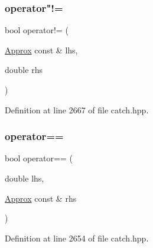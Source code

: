 \hypertarget{class_catch_1_1_detail_1_1_approx_a7497ef839f8026cc0edd6269a80f3e09}{}\label{class_catch_1_1_detail_1_1_approx_a7497ef839f8026cc0edd6269a80f3e09} 
\subsubsection{\texorpdfstring{operator"!=}{operator!=}\hspace{0.1cm}{\footnotesize\ttfamily [2/2]}}
{\footnotesize\ttfamily bool operator!= (\begin{DoxyParamCaption}\item[{\hyperlink{class_catch_1_1_detail_1_1_approx}{Approx} const \&}]{lhs,  }\item[{double}]{rhs }\end{DoxyParamCaption})\hspace{0.3cm}{\ttfamily [friend]}}



Definition at line 2667 of file catch.\+hpp.

\hypertarget{class_catch_1_1_detail_1_1_approx_ac766f044f1c63f0c5997982baefd9049}{}\label{class_catch_1_1_detail_1_1_approx_ac766f044f1c63f0c5997982baefd9049} 
\subsubsection{\texorpdfstring{operator==}{operator==}\hspace{0.1cm}{\footnotesize\ttfamily [1/2]}}
{\footnotesize\ttfamily bool operator== (\begin{DoxyParamCaption}\item[{double}]{lhs,  }\item[{\hyperlink{class_catch_1_1_detail_1_1_approx}{Approx} const \&}]{rhs }\end{DoxyParamCaption})\hspace{0.3cm}{\ttfamily [friend]}}



Definition at line 2654 of file catch.\+hpp.

\hypertarget{class_catch_1_1_detail_1_1_approx_a35999631e6cef569f9da9f3fa910db22}{}\label{class_catch_1_1_detail_1_1_approx_a35999631e6cef569f9da9f3fa910db22} 
